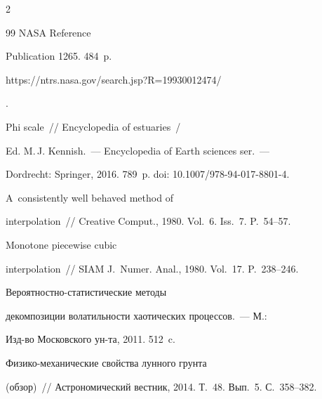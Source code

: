\begin{multicols}{2}
{{\begin{thebibliography}{99}
NASA Reference 


Publication 1265. 484~p.


{\sf  


https://ntrs.nasa.gov/search.jsp?R=19930012474/}.







 Phi scale~// Encyclopedia of estuaries~/ 


Ed. M.\,J. Kennish.~--- Encyclopedia of Earth sciences ser.~---


Dordrecht: Springer, 2016. 789~p. doi: 10.1007/978-94-017-8801-4.







 A~consistently well behaved method of 


interpolation~// Creative Comput., 1980. Vol.~6. Iss.~7. P.~54--57.







 Monotone piecewise cubic 


interpolation~// SIAM J.~Numer. Anal., 1980. Vol.~17. P.~238--246.







 Ве\-ро\-ят\-ност\-но-ста\-ти\-сти\-че\-ские методы 


декомпозиции волатильности хаотических процессов.~--- М.:  


Изд-во Московского ун-та, 2011. 512~c.







 Фи\-зи\-ко-ме\-ха\-ни\-че\-ские свойства лунного грунта 


(обзор)~// Астрономический вестник, 2014. Т.~48. Вып.~5. С.~358--382.





\end{thebibliography}





 }


 }





\end{multicols}





